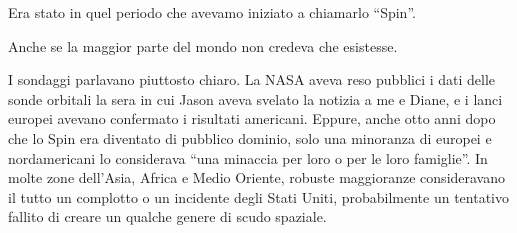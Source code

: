 Era stato in quel periodo che avevamo iniziato a chiamarlo ``Spin''.

Anche se la maggior parte del mondo non credeva che esistesse.

I sondaggi parlavano piuttosto chiaro. La NASA aveva reso pubblici i
dati delle sonde orbitali la sera in cui Jason aveva svelato la notizia
a me e Diane, e i lanci europei avevano confermato i risultati
americani. Eppure, anche otto anni dopo che lo Spin era diventato di
pubblico dominio, solo una minoranza di europei e nordamericani lo
considerava ``una minaccia per loro o per le loro famiglie''. In molte
zone dell'Asia, Africa e Medio Oriente, robuste maggioranze
consideravano il tutto un complotto o un incidente degli Stati Uniti,
probabilmente un tentativo fallito di creare un qualche genere di scudo
spaziale.

